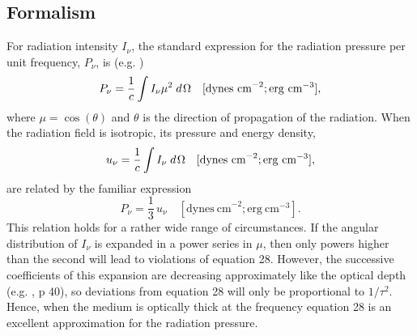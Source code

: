\subsection{Formalism}

For radiation intensity $I_\nu$, the standard expression for the radiation
pressure per unit frequency, $P_\nu$, is (e.g.
\citet{Schwarzschild1965})
\begin{equation}
{P_\nu } = \frac{1}{c}\int {{I_\nu }{\mu ^2}\;d{\kern 1pt} \Omega }
\quad [\mathrm{dynes~ cm}^{-2}; \mathrm{erg~ cm}^{-3}] ,
\end{equation}
where $\mu = \cos(\theta)$ and $\theta$ is the direction of propagation of the radiation.  When
the radiation field is isotropic, its pressure and energy density,
\begin{equation}
{u_\nu } = \frac{1}{c}\int {{I_\nu }\;d{\kern 1pt} \Omega }
\quad [\mathrm{dynes~ cm}^{-2}; \mathrm{erg~ cm}^{-3}] ,
\end{equation}
are related by the familiar expression
\begin{equation}
{P_\nu } = \frac{1}{3}\,{u_\nu }
\quad [\mathrm{dynes~ cm}^{-2}; \mathrm{erg~ cm}^{-3}].
\end{equation}
This relation holds for a rather wide range of circumstances.
If the
angular distribution of $I_\nu$ is expanded in a power series in $\mu$, then only powers
higher than the second will lead to violations of equation 28.
However,
the successive coefficients of this expansion are decreasing approximately
like the optical depth (e.g. \citealp{Schwarzschild1965}, p 40), so deviations from
equation 28 will only be proportional to $1/\tau^2$.  Hence, when the medium is
optically thick at the frequency  equation 28 is an excellent approximation
for the radiation pressure.

